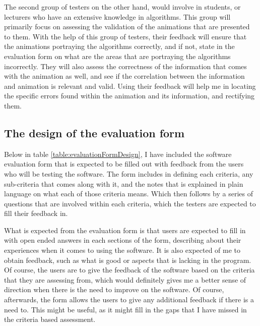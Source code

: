The second group of testers on the other hand, would involve in students, or lecturers who have an extensive knowledge in algorithms. This group will primarily focus on assessing the validation of the animations that are presented to them. With the help of this group of testers, their feedback will ensure that the animations portraying the algorithms correctly, and if not, state in the evaluation form on what are the areas that are portraying the algorithms incorrectly. They will also assess the correctness of the information that comes with the animation as well, and see if the correlation between the information and animation is relevant and valid. Using their feedback will help me in locating the specific errors found within the animation and its information, and rectifying them.



\subsection{The design of the evaluation form}
Below in table \ref{table:evaluationFormDesign}, I have included the software evaluation form that is expected to be filled out with feedback from the users who will be testing the software. The form includes in defining each criteria, any sub-criteria that comes along with it, and the notes that is explained in plain language on what each of those criteria means. Which then follows by a series of questions that are involved within each criteria, which the testers are expected to fill their feedback in. 

What is expected from the evaluation form is that users are expected to fill in with open ended answers in each sections of the form, describing about their experiences when it comes to using the software. It is also expected of me to obtain feedback, such as what is good or aspects that is lacking in the program. Of course, the users are to give the feedback of the software based on the criteria that they are assessing from, which would definitely gives me a better sense of direction when there is the need to improve on the software. Of course, afterwards, the form allows the users to give any additional feedback if there is a need to. This might be useful, as it might fill in the gaps that I have missed in the criteria based assessment.


